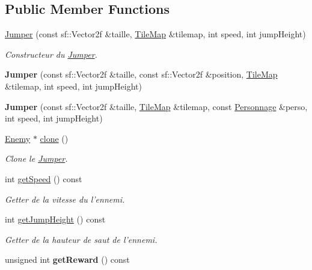 \subsection*{Public Member Functions}
\begin{DoxyCompactItemize}
\item 
\hyperlink{class_jumper_aa3c6e89077ba3a080af168097279cc6f}{Jumper} (const sf\+::\+Vector2f \&taille, \hyperlink{class_tile_map}{Tile\+Map} \&tilemap, int speed, int jump\+Height)
\begin{DoxyCompactList}\small\item\em Constructeur du \hyperlink{class_jumper}{Jumper}. \end{DoxyCompactList}\item 
\hypertarget{class_jumper_ad77cd99be7134fd48c30bd265b4a377e}{{\bfseries Jumper} (const sf\+::\+Vector2f \&taille, const sf\+::\+Vector2f \&position, \hyperlink{class_tile_map}{Tile\+Map} \&tilemap, int speed, int jump\+Height)}\label{class_jumper_ad77cd99be7134fd48c30bd265b4a377e}

\item 
\hypertarget{class_jumper_ab4a5eb758e0668d6cee17e96e0ec1344}{{\bfseries Jumper} (const sf\+::\+Vector2f \&taille, \hyperlink{class_tile_map}{Tile\+Map} \&tilemap, const \hyperlink{class_personnage}{Personnage} \&perso, int speed, int jump\+Height)}\label{class_jumper_ab4a5eb758e0668d6cee17e96e0ec1344}

\item 
\hyperlink{class_enemy}{Enemy} $\ast$ \hyperlink{class_jumper_aa28b8e0acc2f4fa045b29359692fe4ac}{clone} ()
\begin{DoxyCompactList}\small\item\em Clone le \hyperlink{class_jumper}{Jumper}. \end{DoxyCompactList}\item 
int \hyperlink{class_jumper_a36d7e9b3b3718e50c983be709ed359e3}{get\+Speed} () const 
\begin{DoxyCompactList}\small\item\em Getter de la vitesse du l'ennemi. \end{DoxyCompactList}\item 
int \hyperlink{class_jumper_a87f2e80d2d819ab4d2d339401ae18a54}{get\+Jump\+Height} () const 
\begin{DoxyCompactList}\small\item\em Getter de la hauteur de saut de l'ennemi. \end{DoxyCompactList}\item 
\hypertarget{class_jumper_a3b827b7900f19e8c078401dc148e0f7b}{unsigned int {\bfseries get\+Reward} () const }\label{class_jumper_a3b827b7900f19e8c078401dc148e0f7b}

\end{DoxyCompactItemize}
